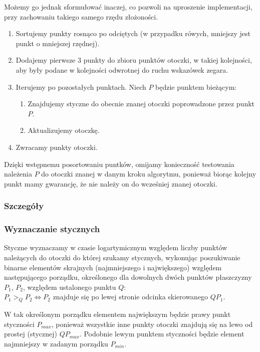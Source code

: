\documentclass[11pt]{article}
\theoremstyle{remark} \newtheorem{definition}{def.}
\theoremstyle{definition} \newtheorem{twierdzenie}{tw.}
\begin{document}
    Możemy go jednak sformułować inaczej, co pozwoli na uproszenie implementacji, przy zachowaniu takiego samego rzędu złożoności. 

    \begin{enumerate}
        \item   Sortujemy punkty rosnąco po odciętych (w przypadku rówych, mniejszy jest punkt o mniejszej rzędnej).
        \item   Dodajemy pierwsze 3 punkty do zbioru punktów otoczki, w takiej kolejności, aby były podane w kolejności odwrotnej 
                do ruchu wskazówek zegara. 
        \item   Iterujemy po pozostałych punktach. Niech $P$ będzie punktem bieżącym: 
                \begin{enumerate}
                    \item   Znajdujemy styczne do obecnie znanej otoczki poprowadzone przez punkt $P$.
                    \item   Aktualizujemy otoczkę. 
                \end{enumerate}
        \item   Zwracamy punkty otoczki.
    \end{enumerate}


    Dzięki wstępnemu posortowaniu puntków, omijamy konieczność testowania należenia $P$ do otoczki znanej w danym kroku algorytmu, ponieważ
    biorąc kolejny punkt mamy gwarancję, że nie należy on do wcześniej znanej otoczki. 



    \subsubsection{Szczegóły}
        \subsubsection*{Wyznaczanie stycznych}

        Styczne wyznaczamy w czasie logartymicznym względem liczby punktów należących do otoczki do której szukamy stycznych, 
        wykonując poszukiwanie binarne elementów skrajnych (najmniejszego i największego) względem następującego porządku, 
        określonego dla dowolnych dwóch punktów płaszczyzny $P_1$, $P_2$, względem ustalonego punktu $Q$: \\
        $P_1 >_Q P_2 \Leftrightarrow P_2$ znajduje się po lewej stronie odcinka skierowanego $QP_1$.

        W tak określonym porządku elementem największym będzie prawy punkt styczności $P_{max}$, ponieważ wszystkie inne punkty otoczki 
        znajdują się na lewo od prostej (stycznej) $QP_{max}$. Podobnie lewym punktem styczności będzie element najmniejszy 
        w zadanym porządku $P_{min}$. \\
\end{document}
